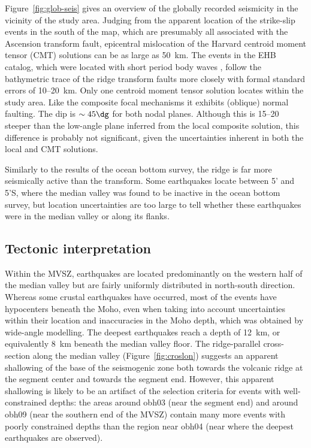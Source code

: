 \documentclass[aguplus]{aguplus}
\newlength{\tw}
\begin{document}
\begin{article}
Figure~\ref{fig:glob-seis} gives an overview of the globally recorded
seismicity in the vicinity of the study area. Judging from the
apparent location of the strike-slip events in the south of the map,
which are presumably all associated with the Ascension transform
fault, epicentral mislocation of the Harvard centroid moment tensor (CMT) solutions
\citep{dziewonski81a} can be as large as 50~km. The events
in the EHB catalog, which were located with short period body waves
\citep{engdahl98}, follow the bathymetric trace of the ridge  transform
faults more closely with formal standard errors of 10--20~km.  Only
one centroid moment tensor solution locates within the study
area. Like the composite focal mechanisms it exhibits (oblique) normal
faulting. The dip is $\sim 45\dg$ for both nodal planes. Although
this is
15--20{\dg} steeper than the low-angle plane inferred from the local
composite solution, this difference is probably not significant,
given the uncertainties inherent in both the local and CMT solutions.

 Similarly to the results of the
ocean bottom survey, the ridge is far more seismically active than the
transform.  Some earthquakes locate between 5' and 5'S,
where the median valley  was found to be inactive in the ocean bottom
survey, but location uncertainties are too large to tell whether these
earthquakes were in the median valley or along its flanks.


\subsection{Tectonic interpretation}

Within the MVSZ, earthquakes are located predominantly on the western half of the median valley but are
fairly uniformly distributed in north-south direction.  Whereas some
crustal earthquakes have occurred, most of the events have hypocenters
beneath the Moho, even when taking into account uncertainties within
their location and inaccuracies in the Moho depth, which was obtained
by wide-angle modelling.  The deepest earthquakes reach a depth of
12~km, or equivalently 8~km beneath the median valley floor. The ridge-parallel cross-section
along the median valley (Figure~\ref{fig:croslon}) suggests an apparent
shallowing of the base of the seismogenic zone both towards the
volcanic ridge at the segment center and towards the segment end.
However, this apparent shallowing is likely to be an artifact of the
selection criteria for events with well-constrained depths: the areas
around obh03 (near the segment end) and around obh09 (near
the southern end of the MVSZ) contain many more
events with poorly constrained depths than the region
near obh04 (near where the deepest earthquakes are observed).



\end{article}
\end{document}
